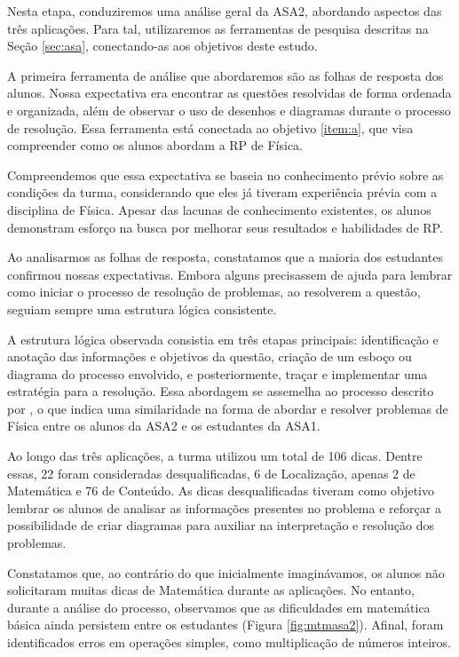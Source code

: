 Nesta etapa, conduziremos uma análise geral da ASA2, abordando aspectos das três aplicações. Para tal, utilizaremos as ferramentas de pesquisa descritas na Seção \ref{sec:asa}, conectando-as aos objetivos deste estudo.

A primeira ferramenta de análise que abordaremos são as folhas de resposta dos alunos. Nossa expectativa era encontrar as questões resolvidas de forma ordenada e organizada, além de observar o uso de desenhos e diagramas durante o processo de resolução. Essa ferramenta está conectada ao objetivo \ref{item:a}, que visa compreender como os alunos abordam a RP de Física.

Compreendemos que essa expectativa se baseia no conhecimento prévio sobre as condições da turma, considerando que eles já tiveram experiência prévia com a disciplina de Física. Apesar das lacunas de conhecimento existentes, os alunos demonstram esforço na busca por melhorar seus resultados e habilidades de RP.

Ao analisarmos as folhas de resposta, constatamos que a maioria dos estudantes confirmou nossas expectativas. Embora alguns precisassem de ajuda para lembrar como iniciar o processo de resolução de problemas, ao resolverem a questão, seguiam sempre uma estrutura lógica consistente.

A estrutura lógica observada consistia em três etapas principais: identificação e anotação das informações e objetivos da questão, criação de um esboço ou diagrama do processo envolvido, e posteriormente, traçar e implementar uma estratégia para a resolução. Essa abordagem se assemelha ao processo descrito por , o que indica uma similaridade na forma de abordar e resolver problemas de Física entre os alunos da ASA2 e os estudantes da ASA1.

Ao longo das três aplicações, a turma utilizou um total de 106 dicas. Dentre essas, 22 foram consideradas desqualificadas, 6 de Localização, apenas 2 de Matemática e 76 de Conteúdo. As dicas desqualificadas tiveram como objetivo lembrar os alunos de analisar as informações presentes no problema e reforçar a possibilidade de criar diagramas para auxiliar na interpretação e resolução dos problemas.

Constatamos que, ao contrário do que inicialmente imaginávamos, os alunos não solicitaram muitas dicas de Matemática durante as aplicações. No entanto, durante a análise do processo, observamos que as dificuldades em matemática básica ainda persistem entre os estudantes (Figura \ref{fig:mtmasa2}). Afinal, foram identificados erros em operações simples, como multiplicação de números inteiros. 

